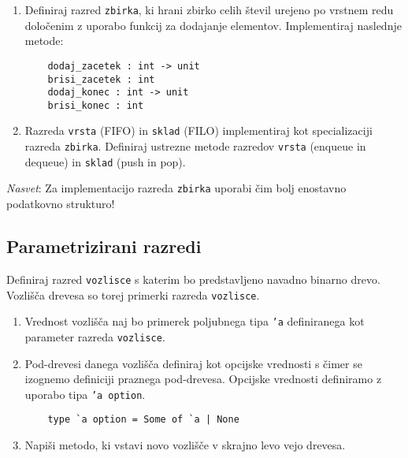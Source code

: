 \begin{ex}
  \begin{enumerate}
  \item Definiraj razred \texttt{zbirka}, ki hrani zbirko celih \v
    stevil urejeno po vrstnem redu dolo\v cenim z uporabo funkcij za
    dodajanje elementov. Implementiraj naslednje metode:

    \begin{verbatim}
    dodaj_zacetek : int -> unit
    brisi_zacetek : int 
    dodaj_konec : int -> unit
    brisi_konec : int  
    \end{verbatim}

  \item Razreda \texttt{vrsta} (FIFO) in \texttt{sklad} (FILO)
    implementiraj kot specializaciji razreda
    \texttt{zbirka}. Definiraj ustrezne metode razredov \texttt{vrsta}
    (enqueue in dequeue) in \texttt{sklad} (push in pop).
  \end{enumerate}

  \emph{Nasvet}: Za implementacijo razreda \texttt{zbirka} uporabi \v
  cim bolj enostavno podatkovno strukturo!



\end{ex} 

\subsection{Parametrizirani razredi}

\begin{ex}
  Definiraj razred \texttt{vozlisce} s katerim bo predstavljeno
  navadno binarno drevo. Vozli\v s\v ca drevesa so torej primerki
  razreda \texttt{vozlisce}.

  \begin{enumerate}
  \item Vrednost vozli\v s\v ca naj bo primerek poljubnega tipa \texttt{'a}
    definiranega kot parameter razreda \texttt{vozlisce}.
    
  \item Pod-drevesi danega vozli\v s\v ca definiraj kot opcijske
    vrednosti s \v cimer se izognemo definiciji praznega
    pod-drevesa. Opcijske vrednosti definiramo z uporabo tipa
    \texttt{'a option}.

    \begin{verbatim}
    type `a option = Some of `a | None
    \end{verbatim}

  \item Napi\v si metodo, ki vstavi novo vozli\v s\v ce v skrajno levo
    vejo drevesa.
  \end{enumerate}



\end{ex} 



